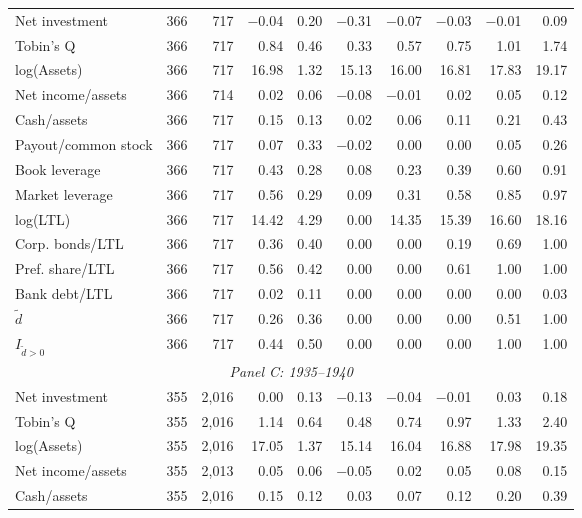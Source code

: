 \begin{table}[p]
\begin{threeparttable}
\begin{tabular}{lrrrrrrrrr}
            \midrule
            Net investment & 366 & 717 & $-$0.04 & 0.20 & $-$0.31 & $-$0.07 & $-$0.03 & $-$0.01 & 0.09 \\
            Tobin's Q & 366 & 717 & 0.84 & 0.46 & 0.33 & 0.57 & 0.75 & 1.01 & 1.74 \\
            log(Assets) & 366 & 717 & 16.98 & 1.32 & 15.13 & 16.00 & 16.81 & 17.83 & 19.17 \\
            Net income/assets & 366 & 714 & 0.02 & 0.06 & $-$0.08 & $-$0.01 & 0.02 & 0.05 & 0.12 \\
            Cash/assets & 366 & 717 & 0.15 & 0.13 & 0.02 & 0.06 & 0.11 & 0.21 & 0.43 \\
            Payout/common stock & 366 & 717 & 0.07 & 0.33 & $-$0.02 & 0.00 & 0.00 & 0.05 & 0.26 \\
            Book leverage & 366 & 717 & 0.43 & 0.28 & 0.08 & 0.23 & 0.39 & 0.60 & 0.91 \\
            Market leverage & 366 & 717 & 0.56 & 0.29 & 0.09 & 0.31 & 0.58 & 0.85 & 0.97 \\
            log(LTL) & 366 & 717 & 14.42 & 4.29 & 0.00 & 14.35 & 15.39 & 16.60 & 18.16 \\
            Corp. bonds/LTL & 366 & 717 & 0.36 & 0.40 & 0.00 & 0.00 & 0.19 & 0.69 & 1.00 \\
            Pref. share/LTL & 366 & 717 & 0.56 & 0.42 & 0.00 & 0.00 & 0.61 & 1.00 & 1.00 \\
            Bank debt/LTL & 366 & 717 & 0.02 & 0.11 & 0.00 & 0.00 & 0.00 & 0.00 & 0.03 \\
            \ensuremath{\tilde{d}} & 366 & 717 & 0.26 & 0.36 & 0.00 & 0.00 & 0.00 & 0.51 & 1.00 \\
            \ensuremath{I_{\tilde{d}>0}} & 366 & 717 & 0.44 & 0.50 & 0.00 & 0.00 & 0.00 & 1.00 & 1.00 \\
            \midrule
            \multicolumn{10}{c}{\textit{Panel C: 1935--1940}} \\
            \midrule
            Net investment & 355 & 2,016 & 0.00 & 0.13 & $-$0.13 & $-$0.04 & $-$0.01 & 0.03 & 0.18 \\
            Tobin's Q & 355 & 2,016 & 1.14 & 0.64 & 0.48 & 0.74 & 0.97 & 1.33 & 2.40 \\
            log(Assets) & 355 & 2,016 & 17.05 & 1.37 & 15.14 & 16.04 & 16.88 & 17.98 & 19.35 \\
            Net income/assets & 355 & 2,013 & 0.05 & 0.06 & $-$0.05 & 0.02 & 0.05 & 0.08 & 0.15 \\
            Cash/assets & 355 & 2,016 & 0.15 & 0.12 & 0.03 & 0.07 & 0.12 & 0.20 & 0.39 \\

\end{tabular}
\end{threeparttable}
\end{table}
